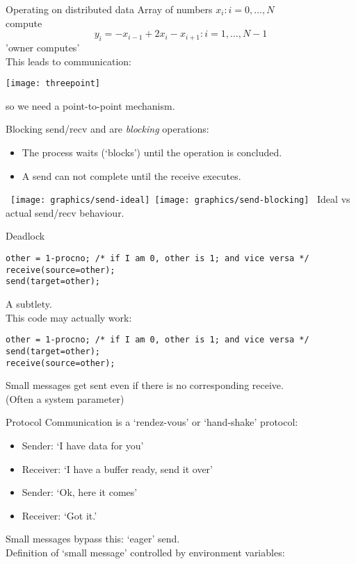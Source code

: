 \begin{numberedframe}{Operating on distributed data}
Array of numbers $x_i\colon i=0,\ldots,N$\\
compute \[ y_i= -x_{i-1}+2x_i-x_{i+1} \colon i=1,\ldots,N-1 \]
'owner computes'\\
This leads to communication:

\texttt{[image: threepoint]}

so we need a point-to-point mechanism.
\end{numberedframe}


\begin{numberedframe}{Blocking send/recv}
 and  are \emph{blocking} operations:
\begin{itemize}
\item The process waits (`blocks') until the operation is concluded.
\item A send can not complete until the receive executes.
\end{itemize}
\hbox{
\texttt{[image: graphics/send-ideal]}
\texttt{[image: graphics/send-blocking]}
}
Ideal vs actual send/recv behaviour.
\end{numberedframe}

\begin{numberedframe}{Deadlock}
\lstset{language=C}
\begin{lstlisting}
other = 1-procno; /* if I am 0, other is 1; and vice versa */
receive(source=other);
send(target=other);
\end{lstlisting}

A subtlety.\\
This code may actually work:
\begin{lstlisting}
other = 1-procno; /* if I am 0, other is 1; and vice versa */
send(target=other);
receive(source=other);
\end{lstlisting}
Small messages get sent even if there is no corresponding receive.\\
(Often a system parameter)
\end{numberedframe}

\begin{numberedframe}{Protocol}
  \label{sl:rendezvous}
Communication is a `rendez-vous' or `hand-shake' protocol:
\begin{itemize}
\item Sender: `I have data for you'
\item Receiver: `I have a buffer ready, send it over'
\item Sender: `Ok, here it comes'
\item Receiver: `Got it.'
\end{itemize}
Small messages bypass this: `eager' send.\\
Definition of `small message' controlled by environment variables:\\
 
\end{numberedframe}

